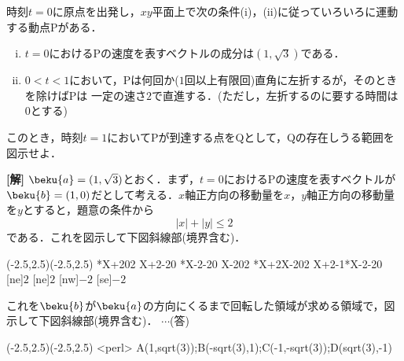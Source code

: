 \documentclass[a4j]{jarticle}
\begin{document}

     \begin{oframed}
     時刻$t=0$に原点を出発し，$xy$平面上で次の条件(i)，(ii)に従っていろいろに運動する動点Pがある．
          \begin{enumerate}[(i)]
          \item $t=0$におけるPの速度を表すベクトルの成分は$(1,\sqrt{3})$である．
          \item $0<t<1$において，Pは何回か($1$回以上有限回)直角に左折するが，そのときを除けばPは
          一定の速さ$2$で直進する．(ただし，左折するのに要する時間は$0$とする)
          \end{enumerate}
     このとき，時刻$t=1$においてPが到達する点をQとして，Qの存在しうる範囲を図示せよ．
     \end{oframed}

\setlength{\columnseprule}{0.4pt}
\begin{multicols}{2}
{\bf[解]} $\beku{a}=(1,\sqrt{3})$とおく．まず，$t=0$におけるPの速度を表すベクトルが$\beku{b}=(1,0)$だとして考える．$x$軸正方向の移動量を$x$，$y$軸正方向の移動量を$y$とすると，題意の条件から
     \[|x|+|y|\le 2\]
である．これを図示して下図斜線部(境界含む)．

     \begin{zahyou}[ul=10mm](-2.5,2.5)(-2.5,2.5)
     \def\Fx{-1*X+2}
     \def\Gx{X+2}
     \def\Hx{-1*X-2}
     \def\Mx{X-2}
     \YGurafu\Fx{0}{2}
     \YGurafu\Gx{-2}{0}
     \YGurafu\Hx{-2}{0}
     \YGurafu\Mx{0}{2}
     \YNurii*\Fx\Mx{0}{2}
     \YNurii*\Gx\Hx{-2}{0}
     [ne]{$2$}
     [ne]{$2$}
     [nw]{$-2$}
     [se]{$-2$}
     \end{zahyou}
     
これを$\beku{b}$が$\beku{a}$の方向にくるまで回転した領域が求める領域で，図示して下図斜線部(境界含む)．
$\cdots$(答)

     \begin{zahyou}[ul=10mm](-2.5,2.5)(-2.5,2.5)
     \tenretu*<perl>{%
     A(1,sqrt(3));B(-sqrt(3),1);C(-1,-sqrt(3));D(sqrt(3),-1)}
     \Drawline{\A\B\C\D\A}
     \Put\A[syaei=xy,xlabel=1,ylabel=\sqrt{3}]{}
     \Nuritubusi*{\A\B\C\D}
     \end{zahyou}

\newpage
\end{multicols}
\end{document}
